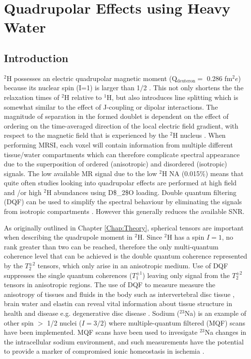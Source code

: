 \chapter{Quadrupolar Effects using Heavy Water}
\label{Chap:Quad}

\section{Introduction}

$^2$H possesses an electric quadrupolar magnetic moment (Q$_{\text{deuteron}}=$ 0.286 fm$^2e$)  because its nuclear spin (I=1) is larger than 1/2 \cite{Stone2015NuclearData}. This not only shortens the the relaxation times of $^2$H relative to $^1$H, but also introduces line splitting which is somewhat similar to the effect of J-coupling or dipolar interactions. The magnitude of separation in the formed doublet is dependent on the effect of ordering on the time-averaged direction of the local electric field gradient, with respect to the magnetic field that is experienced by the $^2$H nucleus \cite{Seelig1977DeuteriumMembranes, Eliav2016MultipleMRS}. When performing \ac{MRSI}, each voxel will contain information from multiple different tissue/water compartments which can therefore complicate spectral appearance due to the superposition of ordered (anisotropic) and disordered (isotropic) signals. The low available MR signal due to the low $^2$H \ac{NA} (0.015\%) means that quite often studies looking into quadrupolar effects are performed at high field  \cite{Gursan2022ResidualMuscle} and \cite{Ooms2015DoubleTissue}/or \cite{Damion2022DoubleLoading} high $^2$H abundances using \ac{D$_2$O} loading. Double quantum filtering (DQF) can be used to simplify the spectral behaviour by eliminating the signals from isotropic compartments \cite{Sharf1995DetectionNMR-Spectroscopy, Perea20072HDisc}. However this generally reduces the available \ac{SNR}. 

As originally outlined in Chapter \ref{Chap:Theory}, spherical tensors are important when describing the quadrupole moment in $^2$H. Since $^2$H has a spin $I=1$, no rank greater than two can be reached, therefore the only multi-quantum coherence level that can be achieved is the double quantum coherence represented by the $T_2^{\pm2}$ tensors, which only arise in an anisotropic medium. Use of \ac{DQF} suppresses the single quantum coherences ($T_1^{\pm1}$) leaving only signal from the $T_2^{\pm2}$ tensors in anisotropic regions. The use of \ac{DQF} to measure measure the anisotropy of tissues and fluids in the body such as intervertebral disc tissue  \cite{Ooms2015DoubleTissue}, brain water \cite{Assaf1997InSpectroscopy} and elastin \cite{Sun2010InvestigationNMR} can reveal vital information about tissue structure in health and disease e.g. degenerative disc disease \cite{Ooms2015DoubleTissue}. Sodium ($^{23}$Na) is an example of other spin $>$ 1/2 nuclei ($I=3/2$) where multiple-quantum filtered (MQF) scans have been implemented. MQF scans have been used to invesigate $^{23}$Na changes in the intracellular sodium environment, and such measurements have the potential to provide a marker of compromised ionic homeostasis in ischemia \cite{Tsang2012Triple-quantum-filteredT}.

